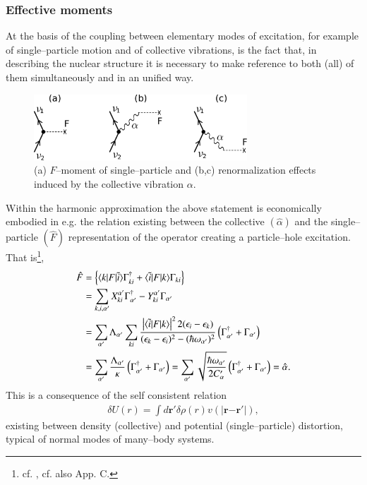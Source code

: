 \begin{subappendices}
\subsubsection{Effective moments}
At the basis of the coupling between elementary modes of excitation, for example of single--particle motion and of collective vibrations, is the fact that, in describing the nuclear structure it is necessary to make reference to both (all) of them simultaneously and in an unified way.
   \begin{figure}
   \centerline{\includegraphics*[width=8cm,angle=0	]{nutshell/figs/fig3_A_1}}
   \caption{(a) $F$--moment of single--particle and (b,c) renormalization effects induced by the collective vibration $\alpha$.}\label{fig3.A.1}
   \end{figure}

Within the harmonic approximation the above statement is economically embodied in e.g. the relation existing between the collective $(\hat \alpha)$ and the single--particle $(\hat F)$ representation of the operator creating a particle--hole excitation. That is\footnote{cf. \cite{Bohr:75}, cf. also \cite{Brink:05} App. C.}, 
\begin{align}\label{eq1AppE1}
\nonumber \hat F&=\left\{\langle {k|F|\tilde i} \rangle\Gamma_{ki}^\dagger+\langle {\tilde i|F|k} \rangle\Gamma_{ki}\right\}\\
\nonumber &=\sum_{k,i,\alpha'}X_{ki}^{\alpha'}\Gamma_{\alpha'}^{\dagger}-Y_{ki}^{\alpha'}\Gamma_{\alpha'}\\
\nonumber &=\sum_{\alpha'}\Lambda_{\alpha'}\sum_{ki}\frac{\left|\langle {\tilde i|F|k} \rangle\right|^22(\epsilon_i-\epsilon_k)}{(\epsilon_k-\epsilon_i)^2-(\hbar\omega_{\alpha'})^2}\left(\Gamma_{\alpha'}^\dagger+\Gamma_{\alpha'}\right)\\
 &=\sum_{\alpha'}\frac{\Lambda_{\alpha'}}{\kappa}\left(\Gamma_{\alpha'}^{\dagger}+\Gamma_{\alpha'}\right)=\sum_{\alpha'}\sqrt{\frac{\hbar\omega_{\alpha'}}{2C_\alpha'}}\left(\Gamma_{\alpha'}^{\dagger}+\Gamma_{\alpha'}\right)=\hat \alpha.
\end{align}
This is a consequence of the self consistent relation
\begin{align}
\delta U(r)=\int d\mathbf r' \delta \rho(r)v(|\mathbf r{-\mathbf r'}|),
\end{align}
existing between density (collective) and potential (single--particle) distortion, typical of normal modes of many--body systems.


\end{subappendices}
